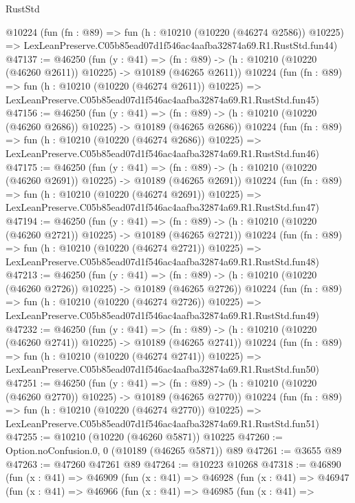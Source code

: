 \begin{lexlean}{RustStd}
\begin{coremodule}
    @10224
    (fun (fn : @89) =>
    fun (h : @10210 (@10220 (@46274 @2586)) @10225) =>
    LexLeanPreserve.C05b85ead07d1f546ac4aafba32874a69.R1.RustStd.fun44)
@47137 := @46250
    (fun (y : @41) =>
    (fn : @89) -> (h : @10210 (@10220 (@46260 @2611)) @10225) -> @10189 (@46265 @2611))
    @10224
    (fun (fn : @89) =>
    fun (h : @10210 (@10220 (@46274 @2611)) @10225) =>
    LexLeanPreserve.C05b85ead07d1f546ac4aafba32874a69.R1.RustStd.fun45)
@47156 := @46250
    (fun (y : @41) =>
    (fn : @89) -> (h : @10210 (@10220 (@46260 @2686)) @10225) -> @10189 (@46265 @2686))
    @10224
    (fun (fn : @89) =>
    fun (h : @10210 (@10220 (@46274 @2686)) @10225) =>
    LexLeanPreserve.C05b85ead07d1f546ac4aafba32874a69.R1.RustStd.fun46)
@47175 := @46250
    (fun (y : @41) =>
    (fn : @89) -> (h : @10210 (@10220 (@46260 @2691)) @10225) -> @10189 (@46265 @2691))
    @10224
    (fun (fn : @89) =>
    fun (h : @10210 (@10220 (@46274 @2691)) @10225) =>
    LexLeanPreserve.C05b85ead07d1f546ac4aafba32874a69.R1.RustStd.fun47)
@47194 := @46250
    (fun (y : @41) =>
    (fn : @89) -> (h : @10210 (@10220 (@46260 @2721)) @10225) -> @10189 (@46265 @2721))
    @10224
    (fun (fn : @89) =>
    fun (h : @10210 (@10220 (@46274 @2721)) @10225) =>
    LexLeanPreserve.C05b85ead07d1f546ac4aafba32874a69.R1.RustStd.fun48)
@47213 := @46250
    (fun (y : @41) =>
    (fn : @89) -> (h : @10210 (@10220 (@46260 @2726)) @10225) -> @10189 (@46265 @2726))
    @10224
    (fun (fn : @89) =>
    fun (h : @10210 (@10220 (@46274 @2726)) @10225) =>
    LexLeanPreserve.C05b85ead07d1f546ac4aafba32874a69.R1.RustStd.fun49)
@47232 := @46250
    (fun (y : @41) =>
    (fn : @89) -> (h : @10210 (@10220 (@46260 @2741)) @10225) -> @10189 (@46265 @2741))
    @10224
    (fun (fn : @89) =>
    fun (h : @10210 (@10220 (@46274 @2741)) @10225) =>
    LexLeanPreserve.C05b85ead07d1f546ac4aafba32874a69.R1.RustStd.fun50)
@47251 := @46250
    (fun (y : @41) =>
    (fn : @89) -> (h : @10210 (@10220 (@46260 @2770)) @10225) -> @10189 (@46265 @2770))
    @10224
    (fun (fn : @89) =>
    fun (h : @10210 (@10220 (@46274 @2770)) @10225) =>
    LexLeanPreserve.C05b85ead07d1f546ac4aafba32874a69.R1.RustStd.fun51)
@47255 := @10210 (@10220 (@46260 @5871)) @10225
@47260 := Option.noConfusion.{0, 0} (@10189 (@46265 @5871)) @89
@47261 := @3655 @89
@47263 := @47260 @47261 @89
@47264 := @10223 @10268
@47318 := @46890
    (fun (x : @41) =>
    @46909
      (fun (x : @41) =>
      @46928
        (fun (x : @41) =>
        @46947
          (fun (x : @41) =>
          @46966
            (fun (x : @41) =>
            @46985
              (fun (x : @41) =>

\end{coremodule}
\end{lexlean}
